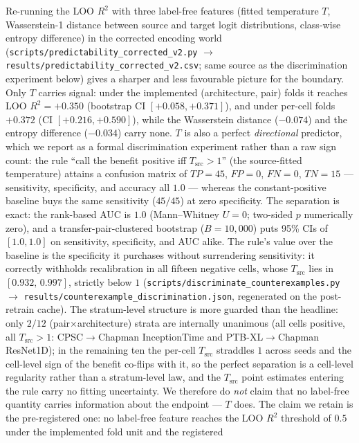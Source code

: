 \documentclass[review,12pt,nonatbib]{elsarticle}
\begin{document}
Re-running the LOO
$R^2$ with three label-free features (fitted temperature $T$,
Wasserstein-1 distance between source and target logit distributions,
class-wise entropy difference) in the corrected encoding world
(\texttt{scripts/predictability\_corrected\_v2.py} $\rightarrow$
\texttt{results/predictability\_corrected\_v2.csv}; same source as the
discrimination experiment below) gives a sharper and less favourable
picture for the boundary. Only $T$ carries signal: under the
implemented (architecture, pair) folds it reaches LOO $R^2 = +0.350$
(bootstrap CI $[+0.058, +0.371]$), and under per-cell folds $+0.372$
(CI $[+0.216, +0.590]$), while the Wasserstein distance ($-0.074$) and
the entropy difference ($-0.034$) carry none. $T$ is also a perfect
\emph{directional} predictor, which we report as a formal
discrimination experiment rather than a raw sign count: the rule
``call the benefit positive iff $T_{\text{src}}>1$'' (the
source-fitted temperature) attains a confusion matrix of
$TP{=}45$, $FP{=}0$, $FN{=}0$, $TN{=}15$ --- sensitivity, specificity,
and accuracy all $1.0$ --- whereas the constant-positive baseline buys
the same sensitivity ($45/45$) at zero specificity. The separation is
exact: the rank-based AUC is $1.0$ (Mann--Whitney $U=0$; two-sided $p$
numerically zero), and a transfer-pair-clustered bootstrap
($B=10{,}000$) puts 95\% CIs of $[1.0,1.0]$ on sensitivity,
specificity, and AUC alike. The rule's value over the baseline is the
specificity it purchases without surrendering sensitivity: it
correctly withholds recalibration in all fifteen negative cells, whose
$T_{\text{src}}$ lies in $[0.932,\,0.997]$, strictly below $1$
(\texttt{scripts/discriminate\_counterexamples.py} $\rightarrow$
\texttt{results/counterexample\_discrimination.json}, regenerated on
the post-retrain cache). The
stratum-level structure is more guarded than the headline: only $2/12$
(pair$\times$architecture) strata are internally unanimous (all cells
positive, all $T_{\text{src}}>1$: CPSC$\rightarrow$Chapman
InceptionTime and PTB-XL$\rightarrow$Chapman ResNet1D); in the
remaining ten the per-cell
$T_{\text{src}}$ straddles $1$ across seeds and the cell-level sign of
the benefit co-flips with it, so the perfect separation is a
cell-level regularity rather than a stratum-level law, and the
$T_{\text{src}}$ point estimates entering the rule carry no fitting
uncertainty.
We therefore do \emph{not} claim that no label-free quantity carries
information about the endpoint --- $T$ does. The claim we retain is the
pre-registered one: no label-free feature reaches the LOO $R^2$
threshold of $0.5$ under the implemented fold unit and the registered
\end{document}

